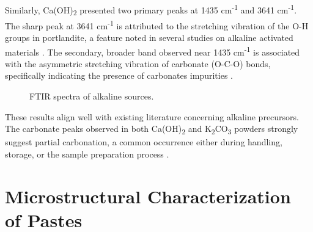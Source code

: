  Similarly, Ca(OH)\textsubscript{2} presented two primary peaks at 1435 cm\textsuperscript{-1} and 3641 cm\textsuperscript{-1}.
 The sharp peak at 3641 cm\textsuperscript{-1} is attributed to the stretching vibration of the O-H groups in portlandite, a feature noted in several studies on alkaline activated materials \cite{batista2025mgosio2}.
 The secondary, broader band observed near 1435 cm\textsuperscript{-1} is associated with the asymmetric stretching vibration of carbonate (O-C-O) bonds, specifically indicating the presence of carbonates impurities \cite{Zhao2023}.
 
 \begin{figure}[H]
     \centering
     \caption{FTIR spectra of alkaline sources.}
     \label{fig:ftir_alkaline_sources}
 \end{figure}

 These results align well with existing literature concerning alkaline precursors. The carbonate peaks observed in both Ca(OH)\textsubscript{2} and K\textsubscript{2}CO\textsubscript{3} powders strongly suggest partial carbonation, a common occurrence either during handling, storage, or the sample preparation process \cite{Lei2021}.

\section{Microstructural Characterization of Pastes}

